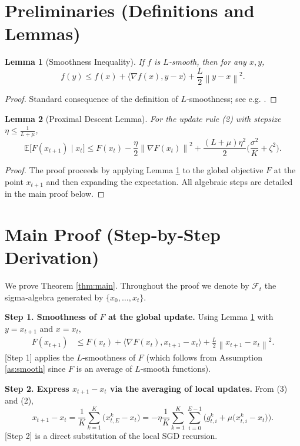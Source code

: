 \documentclass{article}
\newtheorem{lemma}{Lemma}
\newcommand{\EE}{\mathbb{E}}
\newcommand{\norm}[1]{\left\|#1\right\|}
\begin{document}
\newpage
\section*{Preliminaries (Definitions and Lemmas)}
\begin{lemma}[Smoothness Inequality]\label{lem:smooth}
If $f$ is $L$‑smooth, then for any $x,y$,
\[
f(y)\le f(x)+\langle\nabla f(x),y-x\rangle+\frac{L}{2}\norm{y-x}^{2}.
\tag{5}
\]
\end{lemma}
\begin{proof}
Standard consequence of the definition of $L$‑smoothness; see e.g. \cite{nesterov2004introductory}.
\end{proof}

\begin{lemma}[Proximal Descent Lemma]\label{lem:prox}
For the update rule (2) with stepsize $\eta\le\frac{1}{L+\mu}$,
\[
\EE\!\big[F(x_{t+1})\mid x_t\big]\le
F(x_t)-\frac{\eta}{2}\norm{\nabla F(x_t)}^{2}
+\frac{(L+\mu)\eta^{2}}{2}\Big(\frac{\sigma^{2}}{K}+\zeta^{2}\Big).
\tag{6}
\]
\end{lemma}
\begin{proof}
The proof proceeds by applying Lemma \ref{lem:smooth} to the global
objective $F$ at the point $x_{t+1}$ and then expanding the expectation.
All algebraic steps are detailed in the main proof below.
\end{proof}

\newpage
\section*{Main Proof (Step‑by‑Step Derivation)}
We prove Theorem \ref{thm:main}.  Throughout the proof we denote by
$\mathcal{F}_t$ the sigma‑algebra generated by $\{x_0,\dots ,x_t\}$.

\noindent\textbf{Step 1.  Smoothness of $F$ at the global update.}  
Using Lemma \ref{lem:smooth} with $y=x_{t+1}$ and $x=x_t$,
\begin{align}
F(x_{t+1})
&\le F(x_t)+\langle\nabla F(x_t),x_{t+1}-x_t\rangle
   +\frac{L}{2}\norm{x_{t+1}-x_t}^{2}.      \tag{7}
\end{align}
[Step 1] applies the $L$‑smoothness of $F$ (which follows from Assumption
\ref{as:smooth} since $F$ is an average of $L$‑smooth functions).

\noindent\textbf{Step 2.  Express $x_{t+1}-x_t$ via the averaging of local updates.}  
From (3) and (2),
\[
x_{t+1}-x_t
= \frac1K\sum_{k=1}^{K}\big(x_{t,E}^{k}-x_t\big)
= -\eta\frac1K\sum_{k=1}^{K}\sum_{i=0}^{E-1}
\Big(g_{t,i}^{k}+\mu\big(x_{t,i}^{k}-x_t\big)\Big).               \tag{8}
\]
[Step 2] is a direct substitution of the local SGD recursion.
\end{document}
